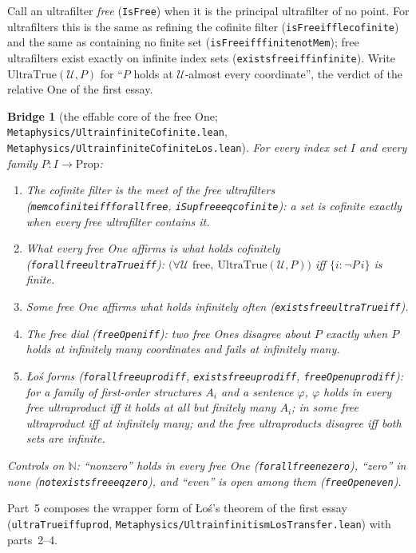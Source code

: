 \documentclass[]{article}
\newtheorem{bridge}[theorem]{Bridge}
\theoremstyle{definition}
\theoremstyle{remark}
\newcommand{\codeus}{\textunderscore\allowbreak}
\newcommand{\code}[1]{\texttt{\let\_\codeus #1}}
\newcommand{\lpath}[1]{{\ttfamily\nolinkurl{#1}}}
\newcommand{\Uf}{\mathcal{U}}
\newcommand{\N}{\mathbb{N}}
\newcommand{\meta}[1]{\lpath{Metaphysics/#1.lean}}
\begin{document}
Call an ultrafilter \emph{free} (\code{IsFree}) when it is the principal ultrafilter of no point.
For ultrafilters this is the same as refining the cofinite filter (\code{isFree\_iff\_le\_cofinite})
and the same as containing no finite set (\code{isFree\_iff\_finite\_notMem}); free ultrafilters exist
exactly on infinite index sets (\code{exists\_free\_iff\_infinite}). Write
$\mathrm{UltraTrue}(\Uf,P)$ for ``$P$ holds at $\Uf$-almost every coordinate'', the verdict of the
relative One of the first essay.

\begin{bridge}[the effable core of the free One; \meta{UltrainfiniteCofinite}, \meta{UltrainfiniteCofiniteLos}]
\label{thm:cofinite}
For every index set $I$ and every family $P:I\to\mathrm{Prop}$:
\begin{enumerate}
\item \emph{The cofinite filter is the meet of the free ultrafilters}
  (\code{mem\_cofinite\_iff\_forall\_free}, \code{iSup\_free\_eq\_cofinite}): a set is cofinite exactly
  when every free ultrafilter contains it.
\item \emph{What every free One affirms is what holds cofinitely}
  (\code{forall\_free\_ultraTrue\_iff}): $\bigl(\forall\Uf\text{ free},\ \mathrm{UltraTrue}(\Uf,P)\bigr)$
  iff $\{i:\neg P\,i\}$ is finite.
\item \emph{Some free One affirms what holds infinitely often}
  (\code{exists\_free\_ultraTrue\_iff}).
\item \emph{The free dial} (\code{freeOpen\_iff}): two free Ones disagree about $P$ exactly when $P$
  holds at infinitely many coordinates and fails at infinitely many.
\item \emph{{\L}o\'s forms} (\code{forall\_free\_uprod\_iff}, \code{exists\_free\_uprod\_iff},
  \code{freeOpen\_uprod\_iff}): for a family of first-order structures $A_i$ and a sentence $\varphi$,
  $\varphi$ holds in every free ultraproduct iff it holds at all but finitely many $A_i$; in some
  free ultraproduct iff at infinitely many; and the free ultraproducts disagree iff both sets are
  infinite.
\end{enumerate}
\emph{Controls on $\N$}: ``nonzero'' holds in every free One (\code{forall\_free\_ne\_zero}),
``zero'' in none (\code{not\_exists\_free\_eq\_zero}), and ``even'' is open among them
(\code{freeOpen\_even}).
\end{bridge}

Part~5 composes the wrapper form of {\L}o\'s's theorem of the first essay
(\code{ultraTrue\_iff\_uprod}, \meta{UltrainfinitismLosTransfer}) with parts~2--4.
\end{document}
